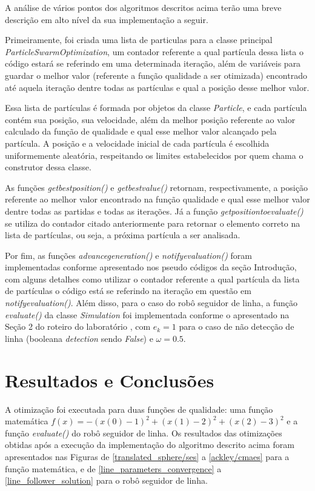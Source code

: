\documentclass[conference]{IEEEtran}
\begin{document}
A análise de vários pontos dos algoritmos descritos acima terão uma breve descrição em alto nível da sua implementação a seguir. 

Primeiramente, foi criada uma lista de particulas para a classe principal \textit{ParticleSwarmOptimization}, um contador referente a qual partícula dessa lista o código estará se referindo em uma determinada iteração, além de variáveis para guardar o melhor valor (referente a função qualidade a ser otimizada) encontrado até aquela iteração dentre todas as partículas e qual a posição desse melhor valor.

Essa lista de partículas é formada por objetos da classe \textit{Particle}, e cada partícula contém sua posição, sua velocidade, além da melhor posição referente ao valor calculado da função de qualidade e qual esse melhor valor alcançado pela partícula. A posição e a velocidade inicial de cada partícula é escolhida uniformemente aleatória, respeitando os limites estabelecidos por quem chama o construtor dessa classe. 

As funções \textit{get\underline{\space}best\underline{\space}position()} e \textit{get\underline{\space}best\underline{\space}value()} retornam, respectivamente, a posição referente ao melhor valor encontrado na função qualidade e qual esse melhor valor dentre todas as partidas e todas as iterações. Já a função \textit{get\underline{\space}position\underline{\space}to\underline{\space}evaluate()} se utiliza do contador citado anteriormente para retornar o elemento correto na lista de partículas, ou seja, a próxima partícula a ser analisada.

Por fim, as funções \textit{advance\underline{\space}generation()} e \textit{notify\underline{\space}evaluation()} foram implementadas conforme apresentado nos pseudo códigos da seção Introdução, com alguns detalhes como utilizar o contador referente a qual partícula da lista de partículas o código está se referindo na iteração em questão em \textit{notify\underline{\space}evaluation()}. Além disso, para o caso do robô seguidor de linha, a função \textit{evaluate()} da classe \textit{Simulation} foi implementada conforme o apresentado na Seção 2 do roteiro do laboratório \cite{b1}, com $e_k = 1$ para o caso de não detecção de linha (booleana \textit{detection} sendo \textit{False}) e $\omega = 0.5$. 

\section{Resultados e Conclusões}
A otimização foi executada para duas funções de qualidade: uma função matemática $f\left ( x \right ) = - \left ( x\left ( 0 \right ) - 1 \right )^{2} + \left ( x\left ( 1 \right ) - 2 \right )^{2} + \left ( x\left ( 2 \right ) - 3 \right )^{2}$ e a função \textit{evaluate()} do robô seguidor de linha. Os resultados das otimizações obtidas após a execução da implementação do algoritmo descrito acima foram apresentados nas Figuras de \ref{translated_sphere/ses} a \ref{ackley/cmaes} para a função matemática, e de \ref{line_parameters_convergence} a \ref{line_follower_solution} para o robô seguidor de linha.
\end{document}
